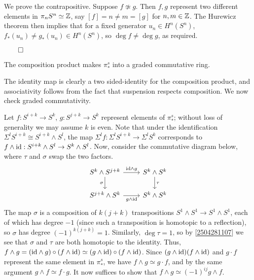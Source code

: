 \documentclass{MetricNotes2023}
\def\inte{\ensuremath\mathbb{Z}}
\def\id{\ensuremath\text{id}}
\def\done{\begin{flushright}\vspace{-4.35ex}\(\qed\)\end{flushright}}
\begin{document}
\begin{ourproof}
We prove the contrapositive. Suppose \(f \not\simeq g\). Then \(f, g\) represent two different elements in \(\pi_nS^n \simeq \inte\), say \([f]=n\neq m=[g]\) for \(n, m \in \inte\). The Hurewicz theorem then implies that for a fixed generator \(u_n \in H^n(S^n)\), \(f_*(u_n)\neq g_*(u_n)\in H^n(S^n)\), so \(\deg f \neq \deg g\), as required.\done
\end{ourproof}

\begin{lemma}
The composition product makes \(\pi_*^s\) into a graded commutative ring. 
\end{lemma}

\begin{ourproof}
The identity map is clearly a two sided-identity for the composition product, and associativity follows from the fact that suspension respects composition. We now check graded commutativity.

Let \(f : S^{i+k}\to S^k\), \(g : S^{j+k}\to S^k\) represent elements of \(\pi_*^s\); without loss of generality we may assume \(k\) is even. Note that under the identification \(\Sigma^l S^{i+k} \cong S^{i+k} \wedge S^l\), the map \(\Sigma^l f : \Sigma^l S^{i+k} \to \Sigma^l S^k\) corresponds to \(f \wedge \id : S^{i+k}\wedge S^l \to S^k \wedge S^l\). Now, consider the commutative diagram below, where \(\tau\) and \(\sigma\) swap the two factors. 
\[\begin{tikzcd}
S^k\wedge S^{j+k} \arrow[r, "\id \wedge g"] \arrow[d, swap, "\sigma"]  & S^k \wedge S^k \arrow[d, "\tau"]  \\
S^{j+k}\wedge S^k \arrow[r, swap, "g \wedge \id"]  & S^k \wedge S^k
\end{tikzcd}\]
The map \(\sigma\) is a composition of \(k(j+k)\) transpositions \(S^1 \wedge S^1 \to S^1 \wedge S^1\), each of which has degree \(-1\) (since such a transposition is homotopic to a reflection), so \(\sigma\) has degree \((-1)^{k(j+k)}=1\). Similarly, \(\deg \tau=1\), so by \ref{2504281107} we see that \(\sigma\) and \(\tau\) are both homotopic to the identity. Thus, \(f \wedge g = (\id \wedge g)\circ (f \wedge \id)\simeq (g \wedge \id)\circ (f \wedge \id)\). Since \((g \wedge \id)(f \wedge \id)\) and \(g\cdot f\) represent the same element in \(\pi_*^s\), we have \(f \wedge g \simeq g\cdot f\), and by the same argument \(g \wedge f \simeq f \cdot g\). It now suffices to show that \(f \wedge g \simeq (-1)^{ij} g \wedge f\).


\end{ourproof}
\end{document}
